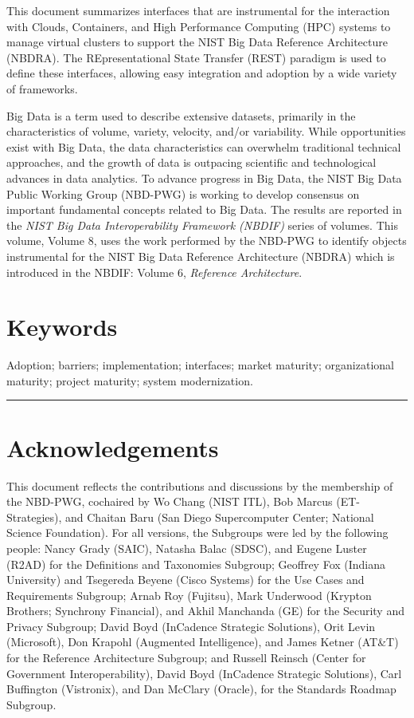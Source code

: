 \documentclass[9pt,]{article}
\begin{document}
This document summarizes interfaces that are instrumental for the
interaction with Clouds, Containers, and High Performance Computing
(HPC) systems to manage virtual clusters to support the NIST Big Data
Reference Architecture (NBDRA). The REpresentational State Transfer
(REST) paradigm is used to define these interfaces, allowing easy
integration and adoption by a wide variety of frameworks.

Big Data is a term used to describe extensive datasets, primarily in the
characteristics of volume, variety, velocity, and/or variability. While
opportunities exist with Big Data, the data characteristics can
overwhelm traditional technical approaches, and the growth of data is
outpacing scientific and technological advances in data analytics. To
advance progress in Big Data, the NIST Big Data Public Working Group
(NBD-PWG) is working to develop consensus on important fundamental
concepts related to Big Data. The results are reported in the \emph{NIST
Big Data Interoperability Framework (NBDIF)} series of volumes. This
volume, Volume 8, uses the work performed by the NBD-PWG to identify
objects instrumental for the NIST Big Data Reference Architecture
(NBDRA) which is introduced in the NBDIF: Volume 6, \emph{Reference
Architecture}.

\hypertarget{keywords}{%
\section{Keywords}\label{keywords}}

Adoption; barriers; implementation; interfaces; market maturity;
organizational maturity; project maturity; system modernization.

\begin{center}\rule{0.5\linewidth}{\linethickness}\end{center}

\hypertarget{acknowledgements}{%
\section{Acknowledgements}\label{acknowledgements}}

This document reflects the contributions and discussions by the
membership of the NBD-PWG, cochaired by Wo Chang (NIST ITL), Bob Marcus
(ET-Strategies), and Chaitan Baru (San Diego Supercomputer Center;
National Science Foundation). For all versions, the Subgroups were led
by the following people: Nancy Grady (SAIC), Natasha Balac (SDSC), and
Eugene Luster (R2AD) for the Definitions and Taxonomies Subgroup;
Geoffrey Fox (Indiana University) and Tsegereda Beyene (Cisco Systems)
for the Use Cases and Requirements Subgroup; Arnab Roy (Fujitsu), Mark
Underwood (Krypton Brothers; Synchrony Financial), and Akhil Manchanda
(GE) for the Security and Privacy Subgroup; David Boyd (InCadence
Strategic Solutions), Orit Levin (Microsoft), Don Krapohl (Augmented
Intelligence), and James Ketner (AT\&T) for the Reference Architecture
Subgroup; and Russell Reinsch (Center for Government Interoperability),
David Boyd (InCadence Strategic Solutions), Carl Buffington (Vistronix),
and Dan McClary (Oracle), for the Standards Roadmap Subgroup.
\end{document}

